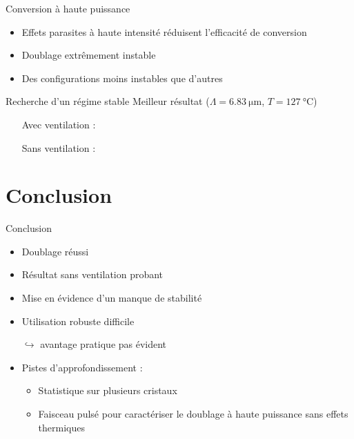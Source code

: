 \documentclass{beamer}
\begin{document}
\begin{frame}{Conversion à haute puissance}
\begin{itemize}[<+->]
\item Effets parasites à haute intensité réduisent l'efficacité de conversion
\item Doublage extrêmement instable
\item Des configurations moins instables que d'autres
\end{itemize}
\end{frame}

\begin{frame}{Recherche d'un régime stable}
Meilleur résultat ($\Lambda=\SI{6.83}{\micro\meter}$, $T = \SI{127}{\celsius}$)
\begin{itemize}
\item[ ] Avec ventilation :
\vspace*{-0.2cm} \hspace*{-0.5cm}
\begin{figure}
	\centering
	
\end{figure}
\vspace*{-1cm} \pause
\item[ ] Sans ventilation :
\vspace*{-0.2cm} \hspace*{-0.5cm}
\begin{figure}
	\centering
	
\end{figure}
\end{itemize}
\end{frame}

\section{Conclusion}

\begin{frame}{Conclusion}
\begin{itemize}%
\item Doublage réussi
\item Résultat sans ventilation probant
\item Mise en évidence d'un manque de stabilité
\item Utilisation robuste difficile
\item[$\hookrightarrow$] avantage pratique pas évident
\item Pistes d'approfondissement :
\begin{itemize}
\item Statistique sur plusieurs cristaux
\item Faisceau pulsé pour caractériser le doublage à haute puissance sans effets thermiques
\end{itemize}
\end{itemize}
\end{frame}
\end{document}
